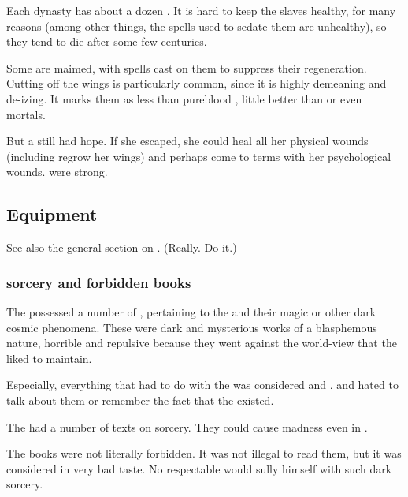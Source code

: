Each dynasty has about a dozen \yurideth{}. It is hard to keep the slaves healthy, for many reasons (among other things, the spells used to sedate them are unhealthy), so they tend to die after some few centuries. 

Some \yurideth{} are maimed, with spells cast on them to suppress their regeneration. 
Cutting off the wings is particularly common, since it is highly demeaning and de-\resphan{}izing. It marks them as less than pureblood \resphain{}, little better than \bezedeth{} or even mortals.

But a \yurid{} still had hope. 
If she escaped, she could heal all her physical wounds (including regrow her wings) and perhaps come to terms with her psychological wounds. 
\Resviel{} were strong. 









\subsection{Equipment}
See also the general section on . 
(Really. Do it.)





\subsubsection{\Bane sorcery and forbidden books}
The \resphain possessed a number of , pertaining to the \SitraAchras and their magic or other dark cosmic phenomena. 
These were dark and mysterious works of a blasphemous nature, horrible and repulsive because they went against the world-view that the \resphain liked to maintain. 

Especially, everything that had to do with the \SitraAchras was considered  and . 
 and hated to talk about them or remember the fact that the \banes existed.

The \resphain had a number of texts on \SitraAchra sorcery.
They could cause madness even in \resphain.

The books were not literally forbidden. 
It was not illegal to read them, but it was considered in very bad taste. 
No respectable \resphan would sully himself with such dark sorcery. 

